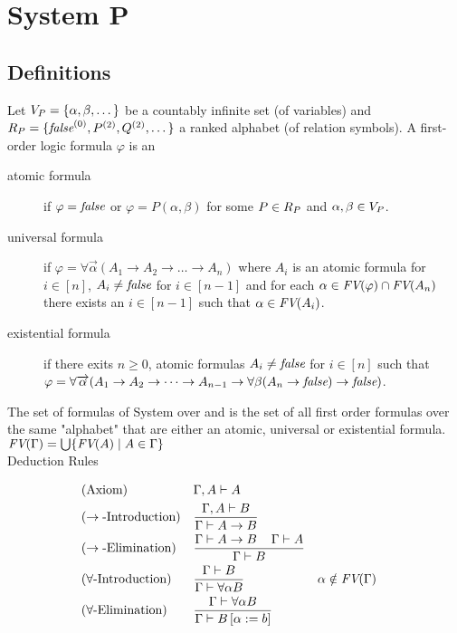 \section{System P}
\subsection{Definitions}
Let $V_P=\{\alpha,\beta,\dots\}$ be a countably infinite set (of variables) and $R_P=\{\emph{false}^{(0)},P^{(2)},Q^{(2)},\dots\}$ a ranked alphabet (of relation symbols).
A first-order logic formula $\varphi$ is an
\begin{description} %
\item[atomic formula] if $\varphi=\emph{false}$ or $\varphi=P(\alpha,\beta)$ for some $P\in R_P$ and $\alpha,\beta\in V_P$.
\item[universal formula] if $\varphi=\forall\overrightarrow{\alpha}(A_1\to A_2 \to\dots\to A_n)$ where $A_i$ is an atomic formula for $i\in\left[n\right]$, $A_i\neq\emph{false}$ for $i\in\left[n-1\right]$ and for each $\alpha\in\emph{FV}(\varphi)\cap\emph{FV}(A_n)$ there exists an $i\in\left[n-1\right]$ such that $\alpha\in\emph{FV}(A_i)$.
\item[existential formula] if there exits $n\ge0$,  atomic formulas $A_i\neq\emph{false}$ for $i\in\left[n\right]$ such that $\varphi=\forall\overrightarrow{\alpha}(A_1\to A_2 \to\dots\to A_{n-1}\to\forall\beta(A_n\to\emph{false})\to\emph{false})$.
\end{description}
The set of formulas of System \SysP{} over \VarP{} and \RelP{} is the set of all first order formulas over the same "alphabet" that are either an atomic, universal or existential formula.\\ 
$\emph{FV}(\Gamma)=\bigcup\{\emph{FV}(A)\mid A\in \Gamma\}$\\
Deduction Rules
\begin{mdframed}
\begingroup
\addtolength{\jot}{0.3cm}
\begin{align*}
&(\text{Axiom}) &&\Gamma,A\vdash A\\
&(\rightarrow\text{-Introduction}) &&\frac{\Gamma,A\vdash B}{\Gamma\vdash A\to B}\\
&(\rightarrow\text{-Elimination}) &&\frac{\Gamma\vdash A\to B \hspace{0.4cm}\Gamma\vdash A}{\Gamma\vdash B}\\
&(\forall\text{-Introduction}) &&\frac{\Gamma\vdash B}{\Gamma\vdash \forall\alpha B} &&\alpha\notin\emph{FV}(\Gamma) \\
&(\forall\text{-Elimination}) &&\frac{\Gamma\vdash \forall\alpha B }{\Gamma\vdash B\left[ \alpha:=b\right] } %
\end{align*}
\endgroup
\end{mdframed}
